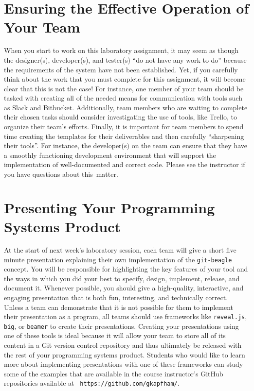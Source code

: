 \section*{Ensuring the Effective Operation of Your Team}

When you start to work on this laboratory assignment, it may seem as though the designer(s), developer(s), and tester(s)
``do not have any work to do'' because the requirements of the system have not been established. Yet, if you carefully
think about the work that you must complete for this assignment, it will become clear that this is not the case! For
instance, one member of your team should be tasked with creating all of the needed means for communication with tools
such as Slack and Bitbucket. Additionally, team members who are waiting to complete their chosen tasks should consider
investigating the use of tools, like Trello, to organize their team's efforts. Finally, it is important for team
members to spend time creating the templates for their deliverables and then carefully ``sharpening their tools''. For
instance, the developer(s) on the team can ensure that they have a smoothly functioning development environment that
will support the implementation of well-documented and correct code. Please see the instructor if you have questions
about \mbox{this matter}.

\section*{Presenting Your Programming Systems Product}

At the start of next week's laboratory session, each team will give a short five minute presentation explaining their
own implementation of the {\tt git-beagle} concept. You will be responsible for highlighting the key features of your
tool and the ways in which you did your best to specify, design, implement, release, and document it. Whenever possible,
you should give a high-quality, interactive, and engaging presentation that is both fun, interesting, and technically
correct. Unless a team can demonstrate that it is not possible for them to implement their presentation as a program,
all teams should use frameworks like {\tt reveal.js}, {\tt big}, or {\tt beamer} to create their presentations. Creating
your presentations using one of these tools is ideal because it will allow your team to store all of its content in a
Git version control repository and thus ultimately be released with the rest of your programming systems product.
Students who would like to learn more about implementing presentations with one of these frameworks can study some of
the examples that are available in the course instructor's GitHub repositories available at {\tt
https://github.com/gkapfham/}.


